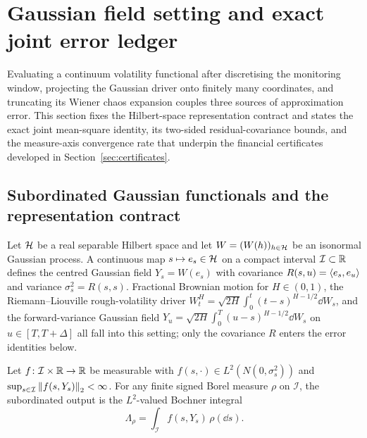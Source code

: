 \section{Gaussian field setting and exact joint error ledger}\label{sec:setting}

Evaluating a continuum volatility functional after discretising the monitoring window, projecting the
Gaussian driver onto finitely many coordinates, and truncating its Wiener chaos expansion couples three
sources of approximation error. This section fixes the Hilbert-space representation contract and states
the exact joint mean-square identity, its two-sided residual-covariance bounds, and the measure-axis
convergence rate that underpin the financial certificates developed in Section~\ref{sec:certificates}.

\subsection{Subordinated Gaussian functionals and the representation contract}\label{sec:contract}
Let $\mathcal{H}$ be a real separable Hilbert space and let $W=(W(h))_{h\in\mathcal{H}}$ be an isonormal Gaussian process.
A continuous map $s\mapsto e_s\in\mathcal{H}$ on a compact interval $\mathcal{I}\subset\mathbb{R}$ defines the centred
Gaussian field $Y_s=W(e_s)$ with covariance $R(s,u)=\left\langle e_s,e_u\right\rangle$ and variance $\sigma_s^2=R(s,s)$.
Fractional Brownian motion for $H\in(0,1)$, the Riemann--Liouville rough-volatility driver
$W_t^H=\sqrt{2H}\int_0^t(t-s)^{H-1/2}\dd W_s$, and the forward-variance Gaussian field
$Y_u=\sqrt{2H}\int_0^T(u-s)^{H-1/2}\dd W_s$ on $u\in[T,T+\Delta]$ all fall into this setting; only the
covariance $R$ enters the error identities below.

\begin{definition}\label{def:output}
Let $f\colon\mathcal{I}\times\mathbb{R}\to\mathbb{R}$ be measurable with $f(s,\cdot)\in L^2(N(0,\sigma_s^2))$ and
$\sup_{s\in\mathcal{I}}\left\lVert f(s,Y_s)\right\rVert_2<\infty$. For any finite signed Borel measure $\rho$ on
$\mathcal{I}$, the subordinated output is the $L^2$-valued Bochner integral
\[
  \Lambda_\rho=\int_{\mathcal{I}} f(s,Y_s)\,\rho(\dd s).
\]
\end{definition}

